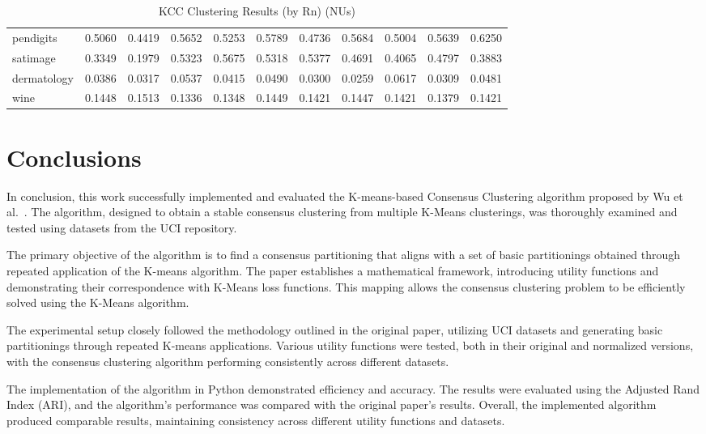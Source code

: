 \documentclass[twocolumn]{article}
\begin{document}
\begin{table}[h]
\begin{tabular}{l|cc|cc|cc|cc|cc}
    pendigits & 0.5060 & 0.4419 & 0.5652 & 0.5253 & 0.5789 & 0.4736 & 0.5684 & 0.5004 & 0.5639 & 0.6250 \\
    satimage & 0.3349 & 0.1979 & 0.5323 & 0.5675 & 0.5318 & 0.5377 & 0.4691 & 0.4065 & 0.4797 & 0.3883 \\
    dermatology & 0.0386 & 0.0317 & 0.0537 & 0.0415 & 0.0490 & 0.0300 & 0.0259 & 0.0617 & 0.0309 & 0.0481 \\
    wine & 0.1448 & 0.1513 & 0.1336 & 0.1348 & 0.1449 & 0.1421 & 0.1447 & 0.1421 & 0.1379 & 0.1421 \\
    \hline
  \end{tabular}
  \caption{KCC Clustering Results (by Rn) (NUs)}
  \label{table:combined-results-nus}
\end{table}  

\section{Conclusions}

In conclusion, this work successfully implemented and evaluated the K-means-based Consensus Clustering algorithm proposed by Wu et al.~\cite{Original}. 
The algorithm, designed to obtain a stable consensus clustering from multiple K-Means clusterings, was thoroughly examined and 
tested using datasets from the UCI repository.

The primary objective of the algorithm is to find a consensus partitioning that aligns with a set of basic partitionings obtained 
through repeated application of the K-means algorithm. The paper establishes a mathematical framework, introducing utility functions
and demonstrating their correspondence with K-Means loss functions. This mapping allows the consensus clustering problem to be efficiently 
solved using the K-Means algorithm.

The experimental setup closely followed the methodology outlined in the original paper, utilizing UCI datasets and generating basic
partitionings through repeated K-means applications. Various utility functions were tested, both in their original and normalized 
versions, with the consensus clustering algorithm performing consistently across different datasets.

The implementation of the algorithm in Python demonstrated efficiency and accuracy. The results were evaluated using the Adjusted 
Rand Index (ARI), and the algorithm's performance was compared with the original paper's results. Overall, the implemented algorithm 
produced comparable results, maintaining consistency across different utility functions and datasets.
\end{document}
